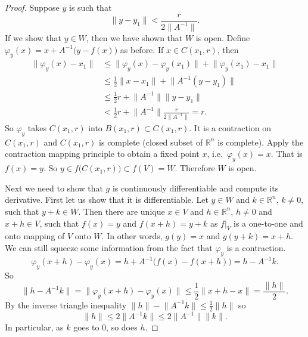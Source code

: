 \documentclass[12pt]{book}
\newcommand{\snorm}[1]{\lVert {#1} \rVert}
\newcommand{\R}{{\mathbb{R}}}
\theoremstyle{plain}
\theoremstyle{remark}
\theoremstyle{definition}
\theoremstyle{exercise}
\theoremstyle{example}
\begin{document}
\begin{proof}
Suppose $y$ is such that
\begin{equation*}
\snorm{y-y_1} <
\frac{r}{2\snorm{A^{-1}}} .
\end{equation*}
If we show that $y \in W$, then we have shown that $W$ is open.
Define $\varphi_y(x) = x+A^{-1}\bigl(y-f(x)\bigr)$ as before.  If $x \in
C(x_1,r)$, then
\begin{equation*}
\begin{split}
\snorm{\varphi_y(x)-x_1}
& \leq
\snorm{\varphi_y(x)-\varphi_y(x_1)} +
\snorm{\varphi_y(x_1)-x_1} \\
& \leq
\frac{1}{2}\snorm{x-x_1} +
\snorm{A^{-1}(y-y_1)} \\
& \leq
\frac{1}{2}r +
\snorm{A^{-1}}\snorm{y-y_1} \\
& <
\frac{1}{2}r +
\snorm{A^{-1}}
\frac{r}{2\snorm{A^{-1}}} = r .
\end{split}
\end{equation*}
So $\varphi_y$ takes $C(x_1,r)$ into $B(x_1,r) \subset C(x_1,r)$.  It is a
contraction on $C(x_1,r)$ and $C(x_1,r)$ is complete (closed subset of $\R^n$
is complete).
Apply the contraction mapping principle to obtain a fixed point $x$,
i.e.\ $\varphi_y(x) = x$.  That is $f(x) = y$.  So $y \in
f\bigl(C(x_1,r)\bigr) \subset f(V) = W$.  Therefore $W$ is open.

Next we need to show that $g$ is continuously differentiable and compute
its derivative.  First let us show that it is differentiable.
Let $y \in W$ and $k \in \R^n$, $k\not= 0$, such that $y+k \in W$.  Then
there are unique
$x \in V$ and $h \in \R^n$, $h \not= 0$ and $x+h \in V$, such that
$f(x) = y$ and $f(x+h) = y+k$ as $f|_V$ is a one-to-one and onto mapping of $V$
onto $W$.  In other words, $g(y) = x$ and $g(y+k) = x+h$.  We can still
squeeze some information from the fact that $\varphi_y$ is a contraction.
\begin{equation*}
\varphi_y(x+h)-\varphi_y(x) = h + A^{-1} \bigl( f(x)-f(x+h) \bigr) = h - A^{-1} k .
\end{equation*}
So
\begin{equation*}
\snorm{h-A^{-1}k} = \snorm{\varphi_y(x+h)-\varphi_y(x)} \leq
\frac{1}{2}\snorm{x+h-x} = \frac{\snorm{h}}{2}.
\end{equation*}
By the inverse triangle inequality $\snorm{h} - \snorm{A^{-1}k} \leq
\frac{1}{2}\snorm{h}$ so
\begin{equation*}
\snorm{h} \leq 2 \snorm{A^{-1}k} \leq 2 \snorm{A^{-1}} \snorm{k}.
\end{equation*}
In particular, as $k$ goes to 0, so does $h$.


\end{proof}
\end{document}
